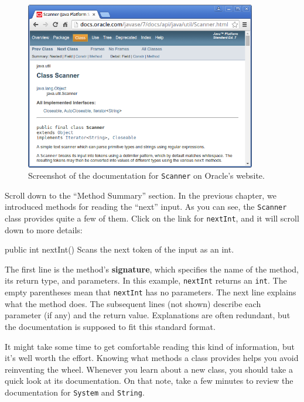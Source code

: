\documentclass[12pt]{book}
\theoremstyle{exercise}
\newcommand{\java}[1]{\verb"#1"}
\newcommand{\java}[1]{\lstinline{#1}} %
\begin{document}
\begin{figure}[!h]
\begin{center}
\includegraphics[width=0.9\textwidth]{figs/scanner.png}
\caption{Screenshot of the documentation for \java{Scanner} on Oracle's website.}
\label{fig:javadoc}
\end{center}
\end{figure}

Scroll down to the ``Method Summary'' section.
In the previous chapter, we introduced methods for reading the ``next'' input.
As you can see, the \java{Scanner} class provides quite a few of them.
Click on the link for \java{nextInt}, and it will scroll down to more details:

\begin{stdout}
public int nextInt()
Scans the next token of the input as an int.
\end{stdout}


The first line is the method's {\bf signature}, which specifies the name of the method, its return type, and parameters.
In this example, \java{nextInt} returns an \java{int}.
The empty parentheses mean that \java{nextInt} has no parameters.
The next line explains what the method does.
The subsequent lines (not shown) describe each parameter (if any) and the return value.
Explanations are often redundant, but the documentation is supposed to fit this standard format.

It might take some time to get comfortable reading this kind of information, but it's well worth the effort.
Knowing what methods a class provides helps you avoid reinventing the wheel.
Whenever you learn about a new class, you should take a quick look at its documentation.
On that note, take a few minutes to review the documentation for \java{System} and \java{String}.
\end{document}
